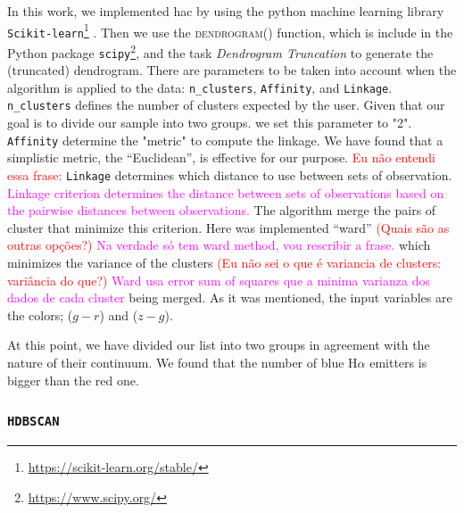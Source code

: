 \documentclass[fleqn,usenatbib]{mnras}
\newcommand{\comment}[1]{\textcolor{red}{#1}}
\newcommand{\luis}[1]{\textcolor{magenta}{#1}}
\begin{document}
In this work, we implemented {\sc hac} by using the python machine learning library
\texttt{Scikit-learn}\footnote{\url{https://scikit-learn.org/stable/}} \citep{Pedregosa:2011}. Then we use the \textsc{dendrogram()} function, which is 
include in the Python package \texttt{scipy}\footnote{\url{https://www.scipy.org/}}, and the task \textit{Dendrogram Truncation}
to generate the (truncated) dendrogram.
There are  parameters to  be taken into account
when the algorithm is applied to the data: \texttt{n\_clusters}, \texttt{Affinity}, and \texttt{Linkage}.
\texttt{n\_clusters} 
defines the number of clusters expected by the user.
Given that our goal is to divide our sample  into two groups. we set this  parameter to "2". \texttt{Affinity} 
determine
the "metric" to compute the linkage. 
We have found that a simplistic metric, the ``Euclidean'', is effective for our purpose.
\comment{Eu não entendi essa frase:} \texttt{Linkage} determines which distance to use between sets of observation. \luis{Linkage criterion determines the distance between sets of observations based on the pairwise distances between observations.}
The algorithm merge the pairs of cluster that minimize this criterion. Here was implemented
``ward'' \comment{(Quais são as outras opções?)} \luis{Na verdade só tem ward method, vou rescribir a frase.} which minimizes the variance of the clusters \comment{(Eu não sei o que é variancia de clusters: variância do que?)} \luis{Ward usa error sum of squares que a minima varianza dos dados de cada cluster} being merged. As it was mentioned,
the input variables are the colors; ($g - r$) and ($z - g$).

At this point, 
we have divided our list  into two groups in agreement
with the nature of their continuum. We found that the number of blue H{$\alpha$}
emitters is bigger than the red one.

\subsubsection{\texttt{HDBSCAN}}
\end{document}
